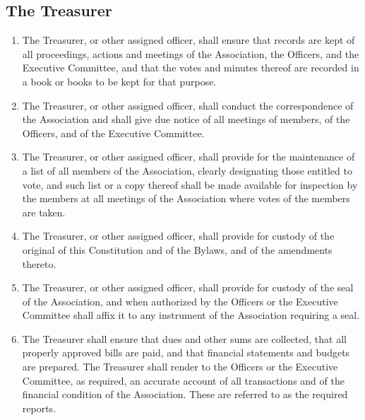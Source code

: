 \documentclass[12pt,letterpaper]{article}
\begin{document}
\subsection{The Treasurer}
\begin{enumerate}
	\item The Treasurer, or other assigned officer, shall ensure that records are kept
	      of all proceedings, actions and meetings of the Association, the Officers,
				and the Executive Committee, and that the votes and minutes thereof are
				recorded in a book or books to be kept for that purpose.
	\item The Treasurer, or other assigned officer, shall conduct the correspondence of
	      the Association and shall give due notice of all meetings of members, of the
				Officers, and of the Executive Committee.
	\item The Treasurer, or other assigned officer, shall provide for the maintenance
	      of a list of all members of the Association, clearly designating those
				entitled to vote, and such list or a copy thereof shall be made available for
				inspection by the members at all meetings of the Association where votes of
				the members are taken.
	\item The Treasurer, or other assigned officer, shall provide for custody of the
	      original of this Constitution and of the Bylaws, and of the amendments thereto.
	\item The Treasurer, or other assigned officer, shall provide for custody of the
	      seal of the Association, and when authorized by the Officers or the Executive
				Committee shall affix it to any instrument of the Association requiring a seal.
	\item The Treasurer shall ensure that dues and other sums are collected, that all
	      properly approved bills are paid, and that financial statements and budgets
				are prepared. The Treasurer shall render to the Officers or the Executive
				Committee, as required, an accurate account of all transactions and of the
				financial condition of the Association. These are referred to as the required
				reports.
\end{enumerate}
\end{document}
